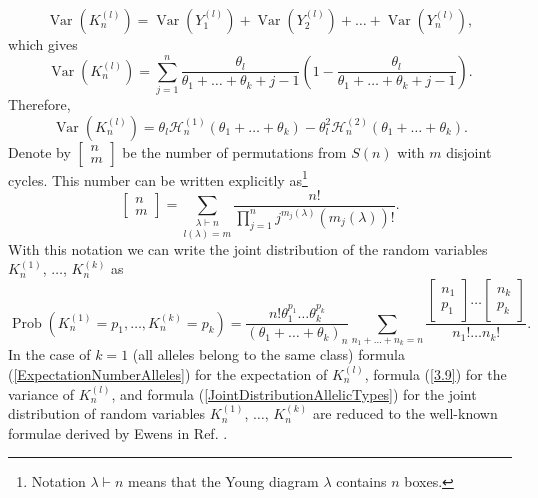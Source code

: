 \documentclass[12pt]{amsart}
\theoremstyle{definition}
\numberwithin{equation}{section}
\DeclareMathOperator{\Prob}{Prob}
\DeclareMathOperator{\Var}{Var}
\begin{document}
\begin{equation}\label{3.7}
\Var\left(K_n^{(l)}\right)
=\Var(Y_1^{(l)})+\Var(Y_2^{(l)})+\ldots+\Var(Y_n^{(l)}),
\end{equation}
which gives
\begin{equation}
\Var\left(K_n^{(l)}\right)=\sum\limits_{j=1}^n\frac{\theta_l}{\theta_1+\ldots+\theta_k+j-1}\left(1-\frac{\theta_l}{\theta_1+\ldots+\theta_k+j-1}\right).
\end{equation}
Therefore,
\begin{equation}\label{3.9}
\Var\left(K_n^{(l)}\right)=\theta_l\mathcal{H}_n^{(1)}\left(\theta_1+\ldots+\theta_k\right)-\theta_l^2\mathcal{H}_n^{(2)}\left(\theta_1+\ldots+\theta_k\right).
\end{equation}
Denote by $\left[\begin{array}{c}
  n \\
  m
\end{array}\right]$ be the number of permutations from $S(n)$ with $m$ disjoint cycles.
This number can be written explicitly as\footnote{Notation $\lambda\vdash n$ means that
the Young diagram $\lambda$ contains $n$ boxes.}
$$
\left[\begin{array}{c}
  n \\
  m
\end{array}\right]=\underset{l(\lambda)=m}{\sum\limits_{\lambda\vdash n}}
\frac{n!}{\prod_{j=1}^nj^{m_j(\lambda)}\left(m_j(\lambda)\right)!}.
$$
With this notation we can write the joint distribution of the random variables
$K_n^{(1)}$, $\ldots$, $K_n^{(k)}$ as
\begin{equation}\label{JointDistributionAllelicTypes}
\Prob\left(K_n^{(1)}=p_1,\ldots,K_n^{(k)}=p_k\right)=
\frac{n!\theta_1^{p_1}\ldots\theta_k^{p_k}}{\left(\theta_1+\ldots+\theta_k\right)_n}
\sum\limits_{n_1+\ldots+n_k=n}\frac{\left[\begin{array}{c}
  n_1 \\
  p_1
\end{array}\right]\ldots
\left[\begin{array}{c}
  n_k \\
  p_k
\end{array}\right]}{n_1!\ldots n_k!}.
\end{equation}
In the case of $k=1$ (all alleles belong to the same class)
formula (\ref{ExpectationNumberAlleles}) for the expectation of $K_n^{(l)}$, formula (\ref{3.9}) for the variance of $K_n^{(l)}$,
and formula (\ref{JointDistributionAllelicTypes})
for the joint distribution of random variables $K_n^{(1)}$,
$\ldots$, $K_n^{(k)}$ are reduced
to the well-known formulae derived by Ewens in Ref. \cite{Ewens}.
\end{document}
